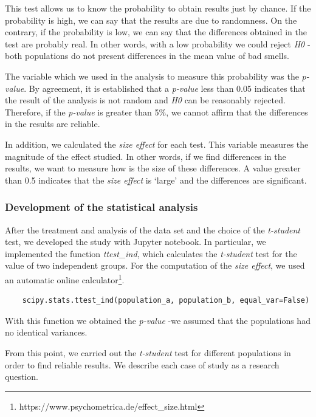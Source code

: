 This test allows us to know the probability to obtain results just by chance. If the probability is high, we can say that the results are due to randomness. On the contrary, if the probability is low, we can say that the differences obtained in the test are probably real. In other words, with a low probability we could reject \textit{H0} -both populations do not present differences in the mean value of bad smells. 

The variable which we used in the analysis to measure this probability was the \textit{p-value}. By agreement, it is established that a \textit{p-value} less than 0.05 indicates that the result of the analysis is not random and \textit{H0} can be reasonably rejected. Therefore, if the \textit{p-value} is greater than 5\%, we cannot affirm that the differences in the results are reliable.  

In addition, we calculated the \textit{size effect} for each test. This variable measures the magnitude of the effect studied. In other words, if we find differences in the results, we want to measure how is the size of these differences. A value greater than 0.5 indicates that the \textit{size effect} is `large' and the differences are significant.

\subsubsection{Development of the statistical analysis}
\label{subsubsec:development_statistical_analysis}

After the treatment and analysis of the data set and the choice of the \textit{t-student} test, we developed the study with Jupyter notebook. In particular, we implemented the function \textit{ttest\_ind}, which calculates the \textit{t-student} test for the value of two independent groups. For the computation of the \textit{size effect}, we used an automatic online calculator\footnote{https://www.psychometrica.de/effect\_size.html}. 

\hfill

{\footnotesize
\begin{verbatim}
    scipy.stats.ttest_ind(population_a, population_b, equal_var=False)
\end{verbatim}
}

\hfill

With this function we obtained the \textit{p-value} -we assumed that the populations had no identical variances.

From this point, we carried out the \textit{t-student} test for different populations in order to find reliable results. We describe each case of study as a research question.


